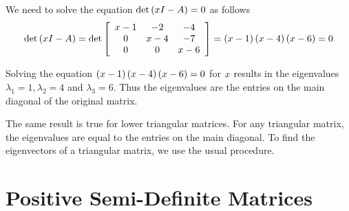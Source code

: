 \begin{solution}
We need to solve the equation $\det \left( x I - A \right) = 0$ as follows
\begin{eqnarray*}
\det \left( x I - A \right) =
\det \left[
\begin{array}{ccc}
x -1 & -2 & -4 \\
0 & x-4 & -7 \\
0 & 0 & x-6
\end{array}
\right] =\left( x-1 \right) \left( x-4 \right) \left( x-6 \right) =0
\end{eqnarray*}

Solving the equation $\left( x-1 \right) \left( x-4
\right) \left( x-6 \right) = 0$ for $x$ results in the eigenvalues 
$\lambda_1 = 1, \lambda_2 = 4$ and $\lambda_3 = 6$.  Thus the
eigenvalues are the entries on the main diagonal of the original
matrix.
\end{solution}

The same result is true for lower triangular matrices. For any triangular matrix,
the eigenvalues are equal to the entries on the main diagonal. To find the 
eigenvectors of a triangular matrix, we use the usual procedure. 



\section{Positive Semi-Definite Matrices}


